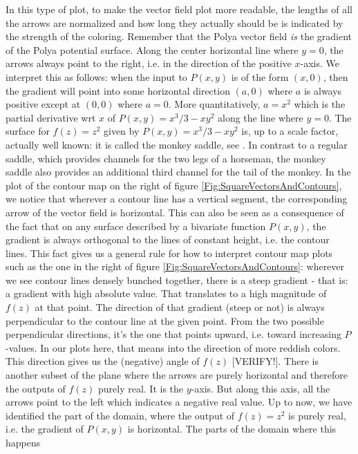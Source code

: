 \documentclass[12pt]{article}
\begin{document}

\medskip
In this type of plot, to make the vector field plot more readable, the lengths of all the arrows are normalized and how long they actually should be is indicated by the strength of the coloring. Remember that the Polya vector field \emph{is} the gradient of the Polya potential surface. Along the center horizontal line where $y=0$, the arrows always point to the right, i.e. in the direction of the positive $x$-axis. We interpret this as follows: when the input to $P(x,y)$ is of the form $(x,0)$, then the gradient will point into some horizontal direction $(a,0)$ where $a$ is always positive except at $(0,0)$ where $a=0$. More quantitatively, $a=x^2$ which is the partial derivative wrt $x$ of $P(x,y) = x^3/3 - x y^2$ along the line where $y=0$. The surface for $f(z) = z^2$ given by $P(x,y) = x^3/3 - x y^2$ is, up to a scale factor, actually well known: it is called the monkey saddle, see \cite{MonkeySaddleWiki}. In contrast to a regular saddle, which provides channels for the two legs of a horseman, the monkey saddle also provides an additional third channel for the tail of the monkey. In the plot of the contour map on the right of figure \ref{Fig:SquareVectorsAndContours}, we notice that wherever a contour line has a vertical segment, the corresponding arrow of the vector field is horizontal. This can also be seen as a consequence of the fact that on any surface described by a bivariate function $P(x,y)$, the gradient is always orthogonal to the lines of constant height, i.e. the contour lines. This fact gives us a general rule for how to interpret contour map plots such as the one in the right of figure \ref{Fig:SquareVectorsAndContours}: wherever we see contour lines densely bunched together, there is a steep gradient - that is: a gradient with high absolute value. That translates to a high magnitude of $f(z)$ at that point. The direction of that gradient (steep or not) is always perpendicular to the contour line at the given point. From the two possible perpendicular directions, it's the one that points upward, i.e. toward increasing $P$-values. In our plots here, that means into the direction of more reddish colors. This direction gives us the (negative) angle of $f(z)$ [VERIFY!]. There is another subset of the plane where the arrows are purely horizontal and therefore the outputs of $f(z)$ purely real. It is the $y$-axis. But along this axis, all the arrows point to the left which indicates a negative real value. Up to now, we have identified the part of the domain, where the output of $f(z) = z^2$ is purely real, i.e. the gradient of $P(x,y)$ is horizontal. The parts of the domain where this happens 
\end{document}
